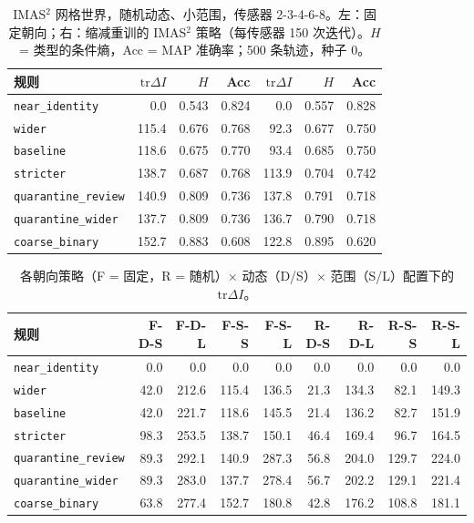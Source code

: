 \documentclass[11pt,a4paper]{article}
\begin{document}
\begin{table}[t]
\centering
\caption{IMAS$^2$ 网格世界，随机动态、小范围，传感器 2-3-4-6-8。左：固定朝向；右：缩减重训的 IMAS$^2$ 策略（每传感器 150 次迭代）。$H$ = 类型的条件熵，Acc = MAP 准确率；500 条轨迹，种子 0。}
\label{tab:imas2-main}
\begin{tabular}{lrrrrrr}
\toprule
规则 & $\mathrm{tr}\Delta I$ & $H$ & Acc & $\mathrm{tr}\Delta I$ & $H$ & Acc \\
\midrule
\texttt{near\_identity} & 0.0 & 0.543 & 0.824 & 0.0 & 0.557 & 0.828 \\
\texttt{wider} & 115.4 & 0.676 & 0.768 & 92.3 & 0.677 & 0.750 \\
\texttt{baseline} & 118.6 & 0.675 & 0.770 & 93.4 & 0.685 & 0.750 \\
\texttt{stricter} & 138.7 & 0.687 & 0.768 & 113.9 & 0.704 & 0.742 \\
\texttt{quarantine\_review} & 140.9 & 0.809 & 0.736 & 137.8 & 0.791 & 0.718 \\
\texttt{quarantine\_wider} & 137.7 & 0.809 & 0.736 & 136.7 & 0.790 & 0.718 \\
\texttt{coarse\_binary} & 152.7 & 0.883 & 0.608 & 122.8 & 0.895 & 0.620 \\
\bottomrule
\end{tabular}
\end{table}

\begin{table}[t]
\centering
\footnotesize
\caption{各朝向策略（F = 固定，R = 随机）$\times$ 动态（D/S）$\times$ 范围（S/L）配置下的 $\mathrm{tr}\Delta I$。}
\label{tab:imas2-all}
\begin{tabular}{lrrrrrrrr}
\toprule
规则 & F-D-S & F-D-L & F-S-S & F-S-L & R-D-S & R-D-L & R-S-S & R-S-L \\
\midrule
\texttt{near\_identity} & 0.0 & 0.0 & 0.0 & 0.0 & 0.0 & 0.0 & 0.0 & 0.0 \\
\texttt{wider} & 42.0 & 212.6 & 115.4 & 136.5 & 21.3 & 134.3 & 82.1 & 149.3 \\
\texttt{baseline} & 42.0 & 221.7 & 118.6 & 145.5 & 21.4 & 136.2 & 82.7 & 151.9 \\
\texttt{stricter} & 98.3 & 253.5 & 138.7 & 150.1 & 46.4 & 169.4 & 96.7 & 164.5 \\
\texttt{quarantine\_review} & 89.3 & 292.1 & 140.9 & 287.3 & 56.8 & 204.0 & 129.7 & 224.0 \\
\texttt{quarantine\_wider} & 89.3 & 283.0 & 137.7 & 278.4 & 56.7 & 202.2 & 129.1 & 221.4 \\
\texttt{coarse\_binary} & 63.8 & 277.4 & 152.7 & 180.8 & 42.8 & 176.2 & 108.8 & 181.1 \\
\bottomrule
\end{tabular}
\end{table}
\end{document}
